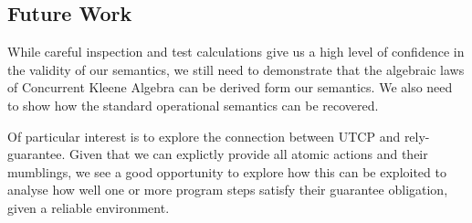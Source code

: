 \subsection{Future Work}\label{ssec:future}

While careful inspection and test calculations
give us a high level of confidence in the validity of our semantics,
we still need to demonstrate that the algebraic laws
of Concurrent Kleene Algebra\cite{}
can be derived form our semantics.
We also need to show how the standard operational semantics can be recovered.

Of particular interest is to explore the connection
between UTCP and rely-guarantee.
Given that we can explictly provide all atomic actions and their mumblings,
we see a good opportunity to explore how this can be exploited
to analyse how well one or more program steps satisfy their
guarantee obligation, given a reliable environment.

